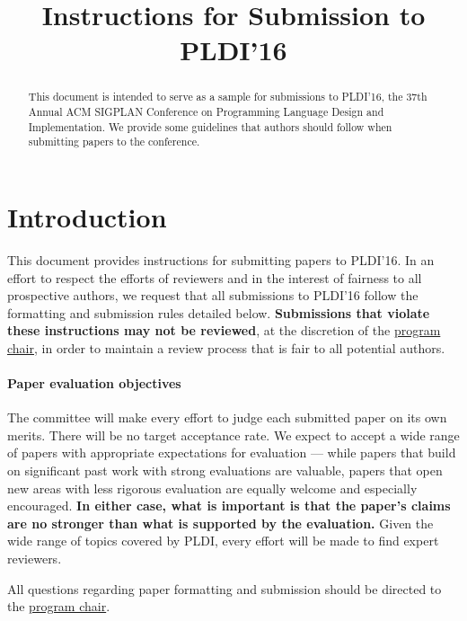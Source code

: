 \documentclass[pldi]{sigplanconf-pldi16}
\begin{document}
%
%

\title{Instructions for Submission to PLDI'16}

\maketitle
\begin{abstract}
  This document is intended to serve as a sample for submissions to PLDI'16,
  the 37th Annual ACM SIGPLAN Conference on Programming Language
  Design and Implementation.  We provide some guidelines
  that authors should follow when submitting papers to the conference.
\end{abstract}

\section{Introduction}

This document provides instructions for submitting papers to PLDI'16.
In an effort to respect the efforts of reviewers and in the interest
of fairness to all prospective authors, we request that all
submissions to PLDI'16 follow the formatting and submission rules
detailed below. \textbf{Submissions that violate these instructions
  may not be reviewed}, at the discretion of the
\href{mailto:emery@cs.umass.edu?subject=[PLDI'16]}{program
  chair}, in order to maintain a review process that is fair to all
potential authors.

\paragraph{Paper evaluation objectives}
The committee will make every effort to judge each submitted paper on
its own merits. There will be no target acceptance rate.  We expect to
accept a wide range of papers with appropriate expectations for
evaluation --- while papers that build on significant past work with
strong evaluations are valuable, papers that open new areas with less
rigorous evaluation are equally welcome and especially
encouraged. \textbf{In either case, what is important is that the
  paper's claims are no stronger than what is supported by the
  evaluation.}  Given the wide range of topics covered by PLDI, every
effort will be made to find expert reviewers.

All questions regarding paper formatting and submission should be
directed to the
\href{mailto:emery@cs.umass.edu?subject=[PLDI'16]}{program
  chair}.
\end{document}
